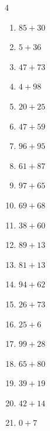 \begin{multicols}{4}
\begin{enumerate}
  \item $85+30$
        \phantom{$=115$}

  \item $5+36$
        \phantom{$=41$}

  \item $47+73$
        \phantom{$=120$}

  \item $4+98$
        \phantom{$=102$}

  \item $20+25$
        \phantom{$=45$}

  \item $47+59$
        \phantom{$=106$}

  \item $96+95$
        \phantom{$=191$}

  \item $61+87$
        \phantom{$=148$}

  \item $97+65$
        \phantom{$=162$}

  \item $69+68$
        \phantom{$=137$}

  \item $38+60$
        \phantom{$=98$}

  \item $89+13$
        \phantom{$=102$}

  \item $81+13$
        \phantom{$=94$}

  \item $94+62$
        \phantom{$=156$}

  \item $26+73$
        \phantom{$=99$}

  \item $25+6$
        \phantom{$=31$}

  \item $99+28$
        \phantom{$=127$}

  \item $65+80$
        \phantom{$=145$}

  \item $39+19$
        \phantom{$=58$}

  \item $42+14$
        \phantom{$=56$}

  \item $0+7$
        \phantom{$=7$}

\columnbreak %


\end{enumerate}
\end{multicols}

